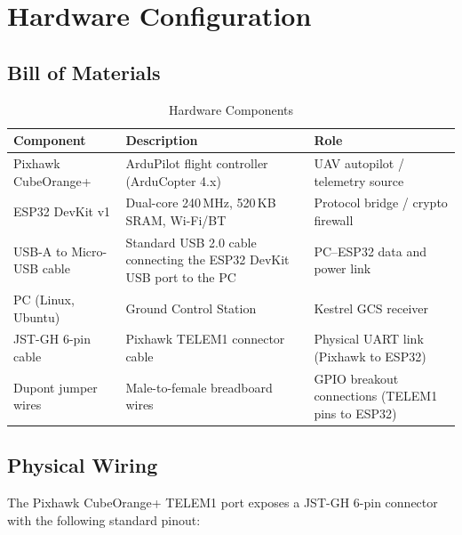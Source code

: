 \documentclass[11pt,a4paper]{article}
\begin{document}
\newpage

\section{Hardware Configuration}
\label{sec:hardware}

\subsection{Bill of Materials}

\begin{table}[H]
    \centering
    \begin{tabularx}{\textwidth}{@{}lXX@{}}
        \toprule
        \textbf{Component} & \textbf{Description} & \textbf{Role} \\
        \midrule
        Pixhawk CubeOrange+ & ArduPilot flight controller (ArduCopter 4.x) &
            UAV autopilot / telemetry source \\
        ESP32 DevKit v1 & Dual-core 240\,MHz, 520\,KB SRAM, Wi-Fi/BT &
            Protocol bridge / crypto firewall \\
        USB-A to Micro-USB cable & Standard USB 2.0 cable connecting the ESP32
            DevKit USB port to the PC &
            PC--ESP32 data and power link \\
        PC (Linux, Ubuntu) & Ground Control Station &
            Kestrel GCS receiver \\
        JST-GH 6-pin cable & Pixhawk TELEM1 connector cable &
            Physical UART link (Pixhawk to ESP32) \\
        Dupont jumper wires & Male-to-female breadboard wires &
            GPIO breakout connections (TELEM1 pins to ESP32) \\
        \bottomrule
    \end{tabularx}
    \caption{Hardware Components}
\end{table}

\subsection{Physical Wiring}

The Pixhawk CubeOrange+ TELEM1 port exposes a JST-GH 6-pin connector with the
following standard pinout:
\end{document}
